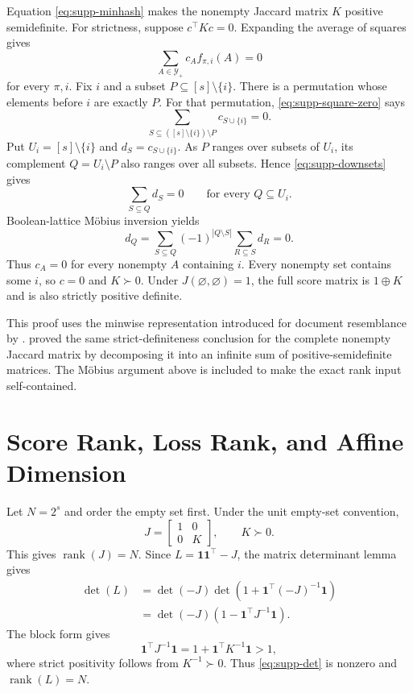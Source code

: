 \documentclass[twoside]{article}
\newcommand{\Y}{\mathcal Y}
\newcommand{\rank}{\operatorname{rank}}
\newcommand{\1}{\mathbf 1}
\begin{document}
Equation \eqref{eq:supp-minhash} makes the nonempty Jaccard matrix $K$ positive semidefinite. For strictness, suppose $c^\top Kc=0$. Expanding the average of squares gives
\begin{equation}
\sum_{A\in\Y_+}c_Af_{\pi,i}(A)=0
\label{eq:supp-square-zero}
\end{equation}
for every $\pi,i$. Fix $i$ and a subset $P\subseteq[s]\setminus\{i\}$. There is a permutation whose elements before $i$ are exactly $P$. For that permutation, \eqref{eq:supp-square-zero} says
\begin{equation}
\sum_{S\subseteq([s]\setminus\{i\})\setminus P}c_{S\cup\{i\}}=0.
\label{eq:supp-downsets}
\end{equation}
Put $U_i=[s]\setminus\{i\}$ and $d_S=c_{S\cup\{i\}}$. As $P$ ranges over subsets of $U_i$, its complement $Q=U_i\setminus P$ also ranges over all subsets. Hence \eqref{eq:supp-downsets} gives
\begin{equation}
\sum_{S\subseteq Q}d_S=0
\qquad\text{for every }Q\subseteq U_i.
\end{equation}
Boolean-lattice M\"obius inversion yields
\begin{equation}
d_Q=\sum_{S\subseteq Q}(-1)^{|Q\setminus S|}
\sum_{R\subseteq S}d_R=0.
\end{equation}
Thus $c_A=0$ for every nonempty $A$ containing $i$. Every nonempty set contains some $i$, so $c=0$ and $K\succ0$. Under $J(\varnothing,\varnothing)=1$, the full score matrix is $1\oplus K$ and is also strictly positive definite.

This proof uses the minwise representation introduced for document resemblance by \citet{broder1997resemblance}. \citet{bouchard2013proof} proved the same strict-definiteness conclusion for the complete nonempty Jaccard matrix by decomposing it into an infinite sum of positive-semidefinite matrices. The M\"obius argument above is included to make the exact rank input self-contained.

\section{Score Rank, Loss Rank, and Affine Dimension}

Let $N=2^s$ and order the empty set first. Under the unit empty-set convention,
\begin{equation}
J=
\begin{bmatrix}
1&0\\
0&K
\end{bmatrix},
\qquad K\succ0.
\label{eq:supp-block-score}
\end{equation}
This gives $\rank(J)=N$. Since $L=\1\1^\top-J$, the matrix determinant lemma gives
\begin{align}
\det(L)
&=\det(-J)\det\left(1+\1^\top(-J)^{-1}\1\right)\\
&=\det(-J)\left(1-\1^\top J^{-1}\1\right).
\label{eq:supp-det}
\end{align}
The block form gives
\begin{equation}
\1^\top J^{-1}\1=1+\1^\top K^{-1}\1>1,
\end{equation}
where strict positivity follows from $K^{-1}\succ0$. Thus \eqref{eq:supp-det} is nonzero and $\rank(L)=N$.
\end{document}
